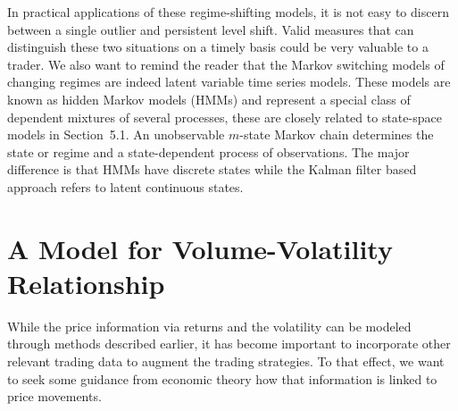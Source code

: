 In practical applications of these regime-shifting models, it is not easy to discern between a single outlier and persistent level shift. Valid measures that can distinguish these two situations on a timely basis could be very valuable to a trader. We also want to remind the reader that the Markov switching models of changing regimes are indeed latent variable time series models. These models are known as hidden Markov models (HMMs) and represent a special class of dependent mixtures of several processes, these are closely related to state-space models in Section~5.1. An unobservable $m$-state Markov chain determines the state or regime and a state-dependent process of observations. The major difference is that HMMs have discrete states while the Kalman filter based approach refers to latent continuous states. 



\section{A Model for Volume-Volatility Relationship \label{s:model_volvol_rel}}


While the price information via returns and the volatility can be modeled through methods described earlier, it has become important to incorporate other relevant trading data to augment the trading strategies. To that effect, we want to seek some guidance from economic theory how that information is linked to price movements.


